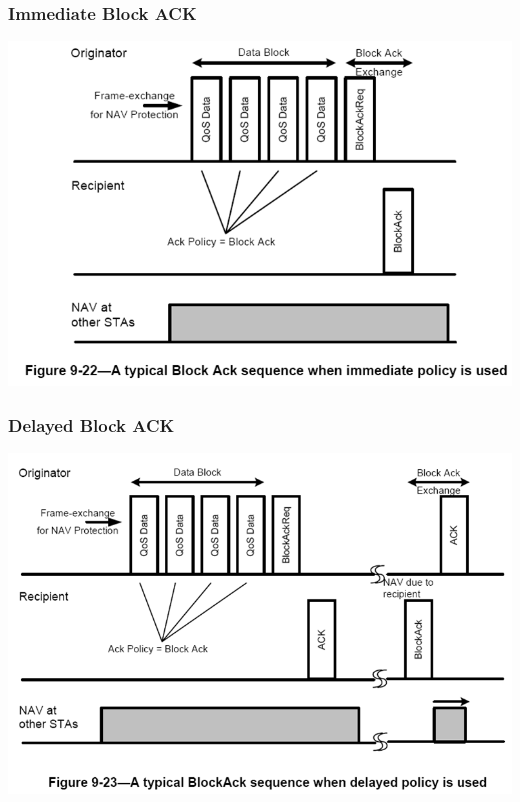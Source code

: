 \documentclass[utf8]{beamer}
\begin{document}
\begin{frame}
\frametitle{Immediate Block ACK}
\begin{center}
 \includegraphics[width=\textwidth]{pic/immediate-block-ack.png}
\end{center}
\end{frame}
\begin{frame}
\frametitle{Delayed Block ACK}
\begin{center}
 \includegraphics[width=\textwidth]{pic/delayed-block-ack.png}
\end{center}
\end{frame}
\end{document}
